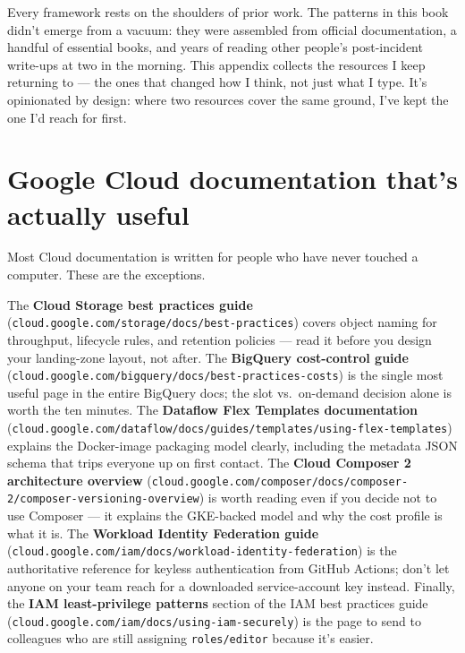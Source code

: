 \documentclass[
  11pt,
  british,
  oneside]{book}
\begin{document}
Every framework rests on the shoulders of prior work. The patterns in
this book didn't emerge from a vacuum: they were assembled from official
documentation, a handful of essential books, and years of reading other
people's post-incident write-ups at two in the morning. This appendix
collects the resources I keep returning to --- the ones that changed how
I think, not just what I type. It's opinionated by design: where two
resources cover the same ground, I've kept the one I'd reach for first.

\hypertarget{google-cloud-documentation-thats-actually-useful}{%
\section{Google Cloud documentation that's actually
useful}\label{google-cloud-documentation-thats-actually-useful}}

Most Cloud documentation is written for people who have never touched a
computer. These are the exceptions.

The \textbf{Cloud Storage best practices guide}
(\texttt{cloud.google.com/storage/docs/best-practices}) covers object
naming for throughput, lifecycle rules, and retention policies --- read
it before you design your landing-zone layout, not after. The
\textbf{BigQuery cost-control guide}
(\texttt{cloud.google.com/bigquery/docs/best-practices-costs}) is the
single most useful page in the entire BigQuery docs; the slot
vs.~on-demand decision alone is worth the ten minutes. The
\textbf{Dataflow Flex Templates documentation}
(\texttt{cloud.google.com/dataflow/docs/guides/templates/using-flex-templates})
explains the Docker-image packaging model clearly, including the
metadata JSON schema that trips everyone up on first contact. The
\textbf{Cloud Composer 2 architecture overview}
(\texttt{cloud.google.com/composer/docs/composer-2/composer-versioning-overview})
is worth reading even if you decide not to use Composer --- it explains
the GKE-backed model and why the cost profile is what it is. The
\textbf{Workload Identity Federation guide}
(\texttt{cloud.google.com/iam/docs/workload-identity-federation}) is the
authoritative reference for keyless authentication from GitHub Actions;
don't let anyone on your team reach for a downloaded service-account key
instead. Finally, the \textbf{IAM least-privilege patterns} section of
the IAM best practices guide
(\texttt{cloud.google.com/iam/docs/using-iam-securely}) is the page to
send to colleagues who are still assigning \texttt{roles/editor} because
it's easier.
\end{document}

